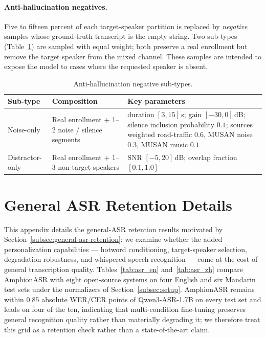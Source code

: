 \paragraph{Anti-hallucination negatives.}
Five to fifteen percent of each target-speaker partition is replaced by
\emph{negative} samples whose ground-truth transcript is the empty
string. Two sub-types (Table~\ref{tab:tsasr_negatives}) are sampled
with equal weight; both preserve a real enrollment but remove the
target speaker from the mixed channel. These samples are intended to
expose the model to cases where the requested speaker is absent.

\begin{table}[!htbp]
  \caption{Anti-hallucination negative sub-types.}
  \label{tab:tsasr_negatives}
  \centering
  \small
  \setlength{\tabcolsep}{4pt}
  \begin{tabular}{lp{4.5cm}p{6.5cm}}
    \toprule
    Sub-type & Composition & Key parameters \\
    \midrule
    Noise-only       & Real enrollment + 1--2 noise / silence segments & duration $[3,15]$\,s; gain $[-30, 0]$\,dB; silence inclusion probability $0.1$; sources weighted road-traffic $0.6$, MUSAN noise $0.3$, MUSAN music $0.1$ \\
    Distractor-only  & Real enrollment + 1--3 non-target speakers      & SNR $[-5, 20]$\,dB; overlap fraction $[0.1, 1.0]$ \\
    \bottomrule
  \end{tabular}
\end{table}

\section{General ASR Retention Details}
\label{sec:appendix-general-asr}

This appendix details the general-ASR retention results motivated by
Section~\ref{subsec:general-asr-retention}: we examine whether the
added personalization capabilities --- hotword conditioning,
target-speaker selection, degradation robustness, and whispered-speech
recognition --- come at the cost of general transcription quality.
Tables~\ref{tab:asr_en} and~\ref{tab:asr_zh} compare AmphionASR with
eight open-source systems on four English and six Mandarin test sets
under the normalizers of Section~\ref{subsec:setup}.
AmphionASR remains within $0.85$ absolute WER/CER points of
Qwen3-ASR-1.7B on every test set and leads on four of the ten,
indicating that multi-condition fine-tuning preserves general
recognition quality rather than materially degrading it; we therefore
treat this grid as a retention check rather than a state-of-the-art
claim.

